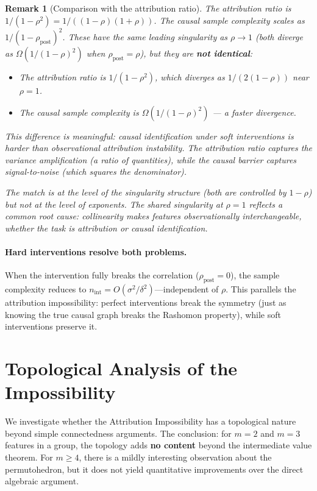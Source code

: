 \documentclass{article}
\newtheorem{remark}[theorem]{Remark}
\begin{document}
\begin{remark}[Comparison with the attribution ratio]
The attribution ratio is $1/(1-\rho^2) = 1/((1-\rho)(1+\rho))$.
The causal sample complexity scales as $1/(1-\rho_{\mathrm{post}})^2$.
These have the same leading singularity as $\rho \to 1$ (both
diverge as $\Omega(1/(1-\rho)^2)$ when $\rho_{\mathrm{post}} = \rho$),
but they are \textbf{not identical}:
\begin{itemize}
    \item The attribution ratio is $1/(1-\rho^2)$, which diverges
      as $1/(2(1-\rho))$ near $\rho = 1$.
    \item The causal sample complexity is $\Omega(1/(1-\rho)^2)$
      --- a \emph{faster} divergence.
\end{itemize}
This difference is meaningful: causal identification under soft
interventions is \emph{harder} than observational attribution
instability. The attribution ratio captures the \emph{variance
amplification} (a ratio of quantities), while the causal barrier
captures \emph{signal-to-noise} (which squares the denominator).

The match is at the level of the singularity structure (both are
controlled by $1-\rho$) but not at the level of exponents.
The shared singularity at $\rho = 1$ reflects a common root cause:
collinearity makes features observationally interchangeable, whether
the task is attribution or causal identification.
\end{remark}

\paragraph{Hard interventions resolve both problems.}
When the intervention fully breaks the correlation
($\rho_{\mathrm{post}} = 0$), the sample complexity reduces to
$n_{\mathrm{int}} = O(\sigma^2/\delta^2)$---independent of $\rho$.
This parallels the attribution impossibility: perfect interventions
break the symmetry (just as knowing the true causal graph breaks
the Rashomon property), while soft interventions preserve it.


\section{Topological Analysis of the Impossibility}
\label{sec:topological}

We investigate whether the Attribution Impossibility has a
topological nature beyond simple connectedness arguments.
The conclusion: for $m = 2$ and $m = 3$ features in a group,
the topology adds \textbf{no content} beyond the intermediate
value theorem. For $m \geq 4$, there is a mildly interesting
observation about the permutohedron, but it does not yield
quantitative improvements over the direct algebraic argument.
\end{document}
